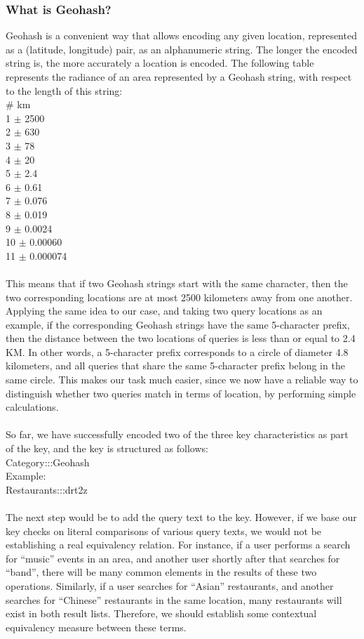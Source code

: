 \subsubsection{What is Geohash?}
Geohash is a convenient way that allows encoding any given location, represented as a (latitude, longitude) pair, as an alphanumeric string. The longer the encoded string is, the more accurately a location is encoded. The following table represents the radiance of an area represented by a Geohash string, with respect to the length of this string:\\
\#  \hspace{5pt} km\\      
1   $\pm$ 2500\\
2   $\pm$ 630\\
3   $\pm$ 78\\
4   $\pm$ 20\\
5   $\pm$ 2.4\\
6   $\pm$ 0.61\\
7   $\pm$ 0.076\\
8   $\pm$ 0.019\\
9   $\pm$ 0.0024\\
10  $\pm$ 0.00060\\
11  $\pm$ 0.000074\\
\\
This means that if two Geohash strings start with the same character, then the two corresponding locations are at most 2500 kilometers away from one another. Applying the same idea to our case, and taking two query locations as an example, if the corresponding Geohash strings have the same 5-character prefix, then the distance between the two locations of queries is less than or equal to 2.4 KM. In other words, a 5-character prefix corresponds to a circle of diameter 4.8 kilometers, and all queries that share the same 5-character prefix belong in the same circle. This makes our task much easier, since we now have a reliable way to distinguish whether two queries match in terms of location, by performing simple calculations.\\\\
So far, we have successfully encoded two of the three key characteristics as part of the key, and the key is structured as follows:\\
Category:::Geohash\\
Example:\\
Restaurants:::drt2z\\\\
The next step would be to add the query text to the key. However, if we base our key checks on literal comparisons of various query texts, we would not be establishing a real equivalency relation. For instance, if a user performs a search for ``music'' events in an area, and another user shortly after that searches for ``band'', there will be many common elements in the results of these two operations. Similarly, if a user searches for ``Asian'' restaurants, and another searches for ``Chinese'' restaurants in the same location, many restaurants will exist in both result lists. Therefore, we should establish some contextual equivalency measure between these terms.
\pagebreak
